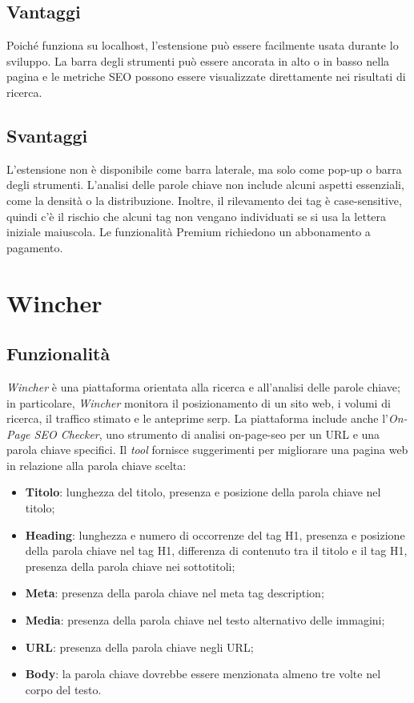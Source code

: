 \subsection{Vantaggi}
\par Poiché funziona su \gls{localhost}, l'estensione può essere facilmente usata durante lo sviluppo. La barra degli strumenti può essere ancorata in alto o in basso nella pagina e le metriche SEO possono essere visualizzate direttamente nei risultati di ricerca.

\subsection{Svantaggi}
\par L'estensione non è disponibile come barra laterale, ma solo come pop-up o barra degli strumenti. L'analisi delle parole chiave non include alcuni aspetti essenziali, come la densità o la distribuzione. Inoltre, il rilevamento dei tag è \gls{case-sensitive}, quindi c'è il rischio che alcuni tag non vengano individuati se si usa la lettera iniziale maiuscola. Le funzionalità Premium richiedono un abbonamento a pagamento. 

\section{Wincher}

\subsection{Funzionalità}
\par \textit{Wincher} è una piattaforma orientata alla ricerca e all'analisi delle parole chiave; in particolare, \textit{Wincher} monitora il posizionamento di un sito web, i volumi di ricerca, il traffico stimato e le anteprime \gls{serp}. La piattaforma include anche l'\textit{On-Page SEO Checker}, uno strumento di analisi \gls{on-page-seo} per un URL e una parola chiave specifici. Il \textit{tool} fornisce suggerimenti per migliorare una pagina web in relazione alla parola chiave scelta:
\begin{itemize}
    \item \textbf{Titolo}: lunghezza del titolo, presenza e posizione della parola chiave nel titolo;
    \item \textbf{Heading}: lunghezza e numero di occorrenze del tag H1, presenza e posizione della parola chiave nel tag H1, differenza di contenuto tra il titolo e il tag H1, presenza della parola chiave nei sottotitoli;
    \item \textbf{Meta}: presenza della parola chiave nel meta tag description;
    \item \textbf{Media}: presenza della parola chiave nel testo alternativo delle immagini;
    \item \textbf{URL}: presenza della parola chiave negli URL;
    \item \textbf{Body}: la parola chiave dovrebbe essere menzionata almeno tre volte nel corpo del testo.
\end{itemize}

